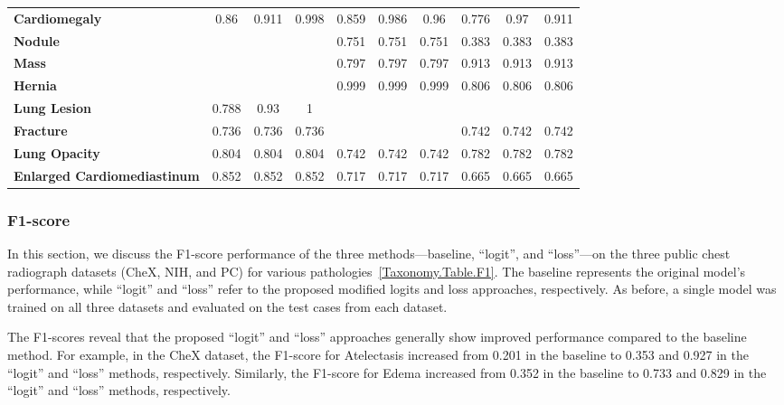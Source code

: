 \begin{table}[]
{\begin{tabular}{lccccccccc}
\textbf{Cardiomegaly}                 & 0.86      & 0.911     & 0.998     & 0.859     & 0.986     & 0.96     & 0.776     & 0.97     & 0.911    \\
\textbf{Nodule}                       &           &           &           & 0.751     & 0.751     & 0.751    & 0.383     & 0.383    & 0.383    \\
\textbf{Mass}                         &           &           &           & 0.797     & 0.797     & 0.797    & 0.913     & 0.913    & 0.913    \\
\textbf{Hernia}                       &           &           &           & 0.999     & 0.999     & 0.999    & 0.806     & 0.806    & 0.806    \\
\textbf{Lung Lesion}                  & 0.788     & 0.93      & 1         &           &           &          &           &          &          \\
\textbf{Fracture}                     & 0.736     & 0.736     & 0.736     &           &           &          & 0.742     & 0.742    & 0.742    \\
\textbf{Lung Opacity}                 & 0.804     & 0.804     & 0.804     & 0.742     & 0.742     & 0.742    & 0.782     & 0.782    & 0.782    \\
\textbf{Enlarged   Cardiomediastinum} & 0.852     & 0.852     & 0.852     & 0.717     & 0.717     & 0.717    & 0.665     & 0.665    & 0.665
\end{tabular}%
}\label{Taxonomy.Table.AUC_default}
\end{table}

\subsubsection*{F1-score}
In this section, we discuss the F1-score performance of the three methods---baseline, ``logit'', and ``loss''---on the three public chest radiograph datasets (CheX, NIH, and PC) for various pathologies~\ref{Taxonomy.Table.F1}. The baseline represents the original model's performance, while ``logit'' and ``loss'' refer to the proposed modified logits and loss approaches, respectively. As before, a single model was trained on all three datasets and evaluated on the test cases from each dataset.

The F1-scores reveal that the proposed ``logit'' and ``loss'' approaches generally show improved performance compared to the baseline method. For example, in the CheX dataset, the F1-score for Atelectasis increased from 0.201 in the baseline to 0.353 and 0.927 in the ``logit'' and ``loss'' methods, respectively. Similarly, the F1-score for Edema increased from 0.352 in the baseline to 0.733 and 0.829 in the ``logit'' and ``loss'' methods, respectively.

